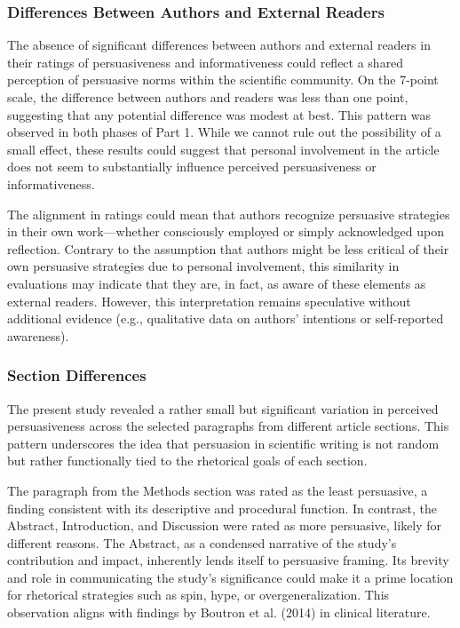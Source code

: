 \documentclass[authordate, meta]{jote-new-article}
\begin{document}
	\subsubsection{Differences Between Authors and External Readers}



	The absence of significant differences between authors and external readers in their ratings of persuasiveness and informativeness could reflect a shared perception of persuasive norms within the scientific community. On the 7-point scale, the difference between authors and readers was less than one point, suggesting that any potential difference was modest at best. This pattern was observed in both phases of Part 1. While we cannot rule out the possibility of a small effect, these results could suggest that personal involvement in the article does not seem to substantially influence perceived persuasiveness or informativeness.



	The alignment in ratings could mean that authors recognize persuasive strategies in their own work—whether consciously employed or simply acknowledged upon reflection. Contrary to the assumption that authors might be less critical of their own persuasive strategies due to personal involvement, this similarity in evaluations may indicate that they are, in fact, as aware of these elements as external readers. However, this interpretation remains speculative without additional evidence (e.g., qualitative data on authors' intentions or self-reported awareness).



	\subsubsection{Section Differences}



	The present study revealed a rather small but significant variation in perceived persuasiveness across the selected paragraphs from different article sections. This pattern underscores the idea that persuasion in scientific writing is not random but rather functionally tied to the rhetorical goals of each section.



	The paragraph from the Methods section was rated as the least persuasive, a finding consistent with its descriptive and procedural function. In contrast, the Abstract, Introduction, and Discussion were rated as more persuasive, likely for different reasons. The Abstract, as a condensed narrative of the study's contribution and impact, inherently lends itself to persuasive framing. Its brevity and role in communicating the study's significance could make it a prime location for rhetorical strategies such as spin, hype, or overgeneralization. This observation aligns with findings by Boutron et al. (2014) in clinical literature.
\end{document}
